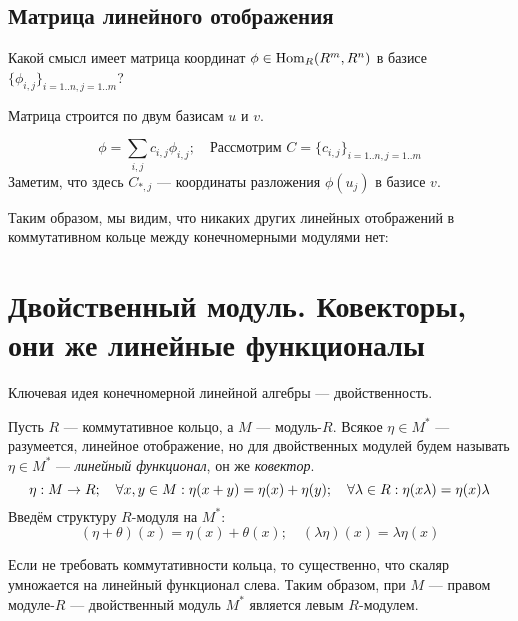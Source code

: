 \documentclass[a4paper]{report}
\begin{document}
    \subsection{Матрица линейного отображения}
    Какой смысл имеет матрица координат $\phi \in \Hom_R(\ind{}R{^m}, \ind{}R{^n})$ в базисе $\{\phi_{i,j}\}_{i = 1..n, j = 1..m}$?

    Матрица строится по двум базисам $u$ и $v$.

    \[\phi = \sum\limits_{i,j}c_{i,j}\phi_{i,j}; \quad \text{Рассмотрим } C = \{c_{i,j}\}_{i=1..n,j=1..m}\]
    Заметим, что здесь $C_{*,j}$ --- координаты разложения $\phi(u_j)$ в базисе $v$.

    Таким образом, мы видим, что никаких других линейных отображений в коммутативном кольце между конечномерными модулями нет:


    \section{Двойственный модуль. Ковекторы, они же линейные функционалы}
    Ключевая идея конечномерной линейной алгебры --- двойственность.

    Пусть $R$ --- коммутативное кольцо, а $M$ --- модуль-$R$.
    Всякое $\eta \in M^*$ --- разумеется, линейное отображение, но для двойственных модулей будем называть $\eta \in M^*$ --- \textit{линейный функционал}, он же \textit{ковектор}.
    \[\eta: M \rightarrow R;\quad \forall x, y \in M: \eta(x + y) = \eta(x) + \eta(y);\quad \forall \lambda \in R: \eta(x \lambda) = \eta(x) \lambda\]
    Введём структуру $R$-модуля на $M^*$:
    \[(\eta + \theta)(x) = \eta(x) + \theta(x); \quad (\lambda \eta)(x) = \lambda \eta(x)\]

    Если не требовать коммутативности кольца, то существенно, что скаляр умножается на линейный функционал слева.
    Таким образом, при $M$ --- правом модуле-$R$ --- двойственный модуль $M^*$ является левым $R$-модулем.
\end{document}
